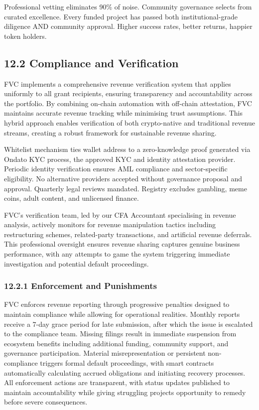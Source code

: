\documentclass[
  paper=a4,
  ,captions=tableheading
]{scrartcl}
\begin{document}
Professional vetting eliminates 90\% of noise. Community governance
selects from curated excellence. Every funded project has passed both
institutional-grade diligence AND community approval. Higher success
rates, better returns, happier token holders.

\subsection{12.2 Compliance and
Verification}\label{compliance-and-verification}

FVC implements a comprehensive revenue verification system that
applies uniformly to all grant recipients, ensuring transparency and
accountability across the portfolio. By combining on-chain automation
with off-chain attestation, FVC maintains accurate revenue
tracking while minimising trust assumptions. This hybrid approach
enables verification of both crypto-native and traditional revenue
streams, creating a robust framework for sustainable revenue sharing.

Whitelist mechanism ties wallet address to a zero-knowledge proof
generated via Ondato KYC process, the approved KYC and identity
attestation provider. Periodic identity verification ensures AML
compliance and sector-specific eligibility. No alternative providers
accepted without governance proposal and approval. Quarterly legal
reviews mandated. Registry excludes gambling, meme coins, adult content,
and unlicensed finance.

FVC's verification team, led by our CFA Accountant specialising
in revenue analysis, actively monitors for revenue manipulation tactics
including restructuring schemes, related-party transactions, and
artificial revenue deferrals. This professional oversight ensures
revenue sharing captures genuine business performance, with any attempts
to game the system triggering immediate investigation and potential
default proceedings.

\subsubsection{12.2.1 Enforcement and
Punishments}\label{enforcement-and-punishments}

FVC enforces revenue reporting through progressive penalties
designed to maintain compliance while allowing for operational
realities. Monthly reports receive a 7-day grace period for late
submission, after which the issue is escalated to the compliance team.
Missing filings result in immediate suspension from ecosystem
benefits including additional funding, community support, and governance
participation. Material misrepresentation or persistent non-compliance
triggers formal default proceedings, with smart contracts automatically
calculating accrued obligations and initiating recovery processes. All
enforcement actions are transparent, with status updates published to
maintain accountability while giving struggling projects opportunity to
remedy before severe consequences.
\end{document}
